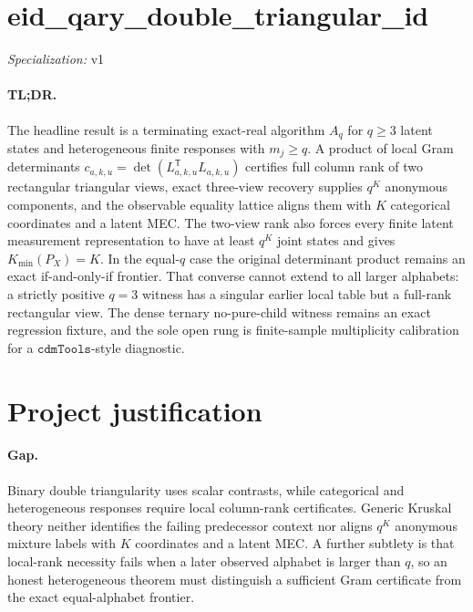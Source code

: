 \documentclass{article}
\begin{document}
\sloppy

\section*{eid\_\allowbreak{}qary\_\allowbreak{}double\_\allowbreak{}triangular\_\allowbreak{}id}

\noindent\textit{Specialization:} v1\par

\paragraph{TL;DR.} The headline result is a terminating exact-real algorithm \(A_q\) for \(q\ge3\) latent states and heterogeneous finite responses with \(m_j\ge q\).  A product of local Gram determinants \(c_{a,k,u}=\det(L_{a,k,u}^{\mathsf T}L_{a,k,u})\) certifies full column rank of two rectangular triangular views, exact three-view recovery supplies \(q^K\) anonymous components, and the observable equality lattice aligns them with \(K\) categorical coordinates and a latent MEC.  The two-view rank also forces every finite latent measurement representation to have at least \(q^K\) joint states and gives \(K_{\min}(P_X)=K\).  In the equal-\(q\) case the original determinant product remains an exact if-and-only-if frontier.  That converse cannot extend to all larger alphabets: a strictly positive \(q=3\) witness has a singular earlier local table but a full-rank rectangular view.  The dense ternary no-pure-child witness remains an exact regression fixture, and the sole open rung is finite-sample multiplicity calibration for a \(\texttt{cdmTools}\)-style diagnostic.

\section{Project justification}

\paragraph{Gap.} Binary double triangularity uses scalar contrasts, while categorical and heterogeneous responses require local column-rank certificates.  Generic Kruskal theory neither identifies the failing predecessor context nor aligns \(q^K\) anonymous mixture labels with \(K\) coordinates and a latent MEC.  A further subtlety is that local-rank necessity fails when a later observed alphabet is larger than \(q\), so an honest heterogeneous theorem must distinguish a sufficient Gram certificate from the exact equal-alphabet frontier.
\end{document}
